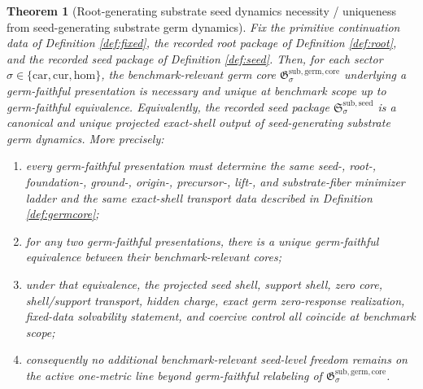 \documentclass[11pt]{article}
\newcommand{\Car}{\mathrm{car}}
\newcommand{\Cur}{\mathrm{cur}}
\newcommand{\Hom}{\mathrm{hom}}
\newcommand{\SeedPackage}{\mathfrak S^{\mathrm{sub,seed}}}
\newcommand{\GermCore}{\mathfrak G^{\mathrm{sub,germ,core}}}
\newtheorem{theorem}{Theorem}
\begin{document}
\begin{theorem}[Root-generating substrate seed dynamics necessity / uniqueness from seed-generating substrate germ dynamics]
\label{thm:main}
Fix the primitive continuation data of Definition \ref{def:fixed}, the recorded root package of Definition \ref{def:root}, and the recorded seed package of Definition \ref{def:seed}. Then, for each sector \(\sigma\in\{\Car,\Cur,\Hom\}\), the benchmark-relevant germ core \(\GermCore_{\sigma}\) underlying a germ-faithful presentation is necessary and unique at benchmark scope up to germ-faithful equivalence. Equivalently, the recorded seed package \(\SeedPackage_{\sigma}\) is a canonical and unique projected exact-shell output of seed-generating substrate germ dynamics. More precisely:
\begin{enumerate}
    \item every germ-faithful presentation must determine the same seed-, root-, foundation-, ground-, origin-, precursor-, lift-, and substrate-fiber minimizer ladder and the same exact-shell transport data described in Definition \ref{def:germcore};
    \item for any two germ-faithful presentations, there is a unique germ-faithful equivalence between their benchmark-relevant cores;
    \item under that equivalence, the projected seed shell, support shell, zero core, shell/support transport, hidden charge, exact germ zero-response realization, fixed-data solvability statement, and coercive control all coincide at benchmark scope;
    \item consequently no additional benchmark-relevant seed-level freedom remains on the active one-metric line beyond germ-faithful relabeling of \(\GermCore_{\sigma}\).
\end{enumerate}
\end{theorem}
\end{document}
